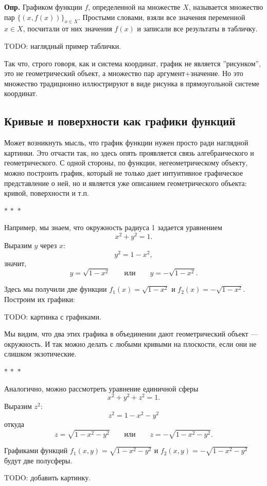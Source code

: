 \documentclass[a4paper,12pt]{article}
\newcommand{\threestars}{\begin{center}$ {\ast}\,{\ast}\,{\ast} $\end{center}}
\newcounter{z-counter}
\newcounter{th-counter}
\newcounter{df-counter}
\newcommand{\df}{\par\noindent\textbf{Опр.} }
\begin{document}
\df Графиком функции $f$, определенной на множестве $X$, называется множество пар $\{(x,f(x))\}_{x \in X}$. Простыми словами, взяли все значения переменной $x \in X$, посчитали от них значения $f(x)$ и записали все результаты в табличку.

TODO: наглядный пример таблички.

Так что, строго говоря, как и система координат, график не является ''рисунком'', это не геометрический объект, а множество пар аргумент+значение. Но это множество традиционно иллюстрируют в виде рисунка в прямоугольной системе координат.

\subsection*{Кривые и поверхности как графики функций}

Может возникнуть мысль, что график функции нужен просто ради наглядной картинки. Это отчасти так, но здесь опять проявляется связь алгебраического и геометрического. С одной стороны, по функции, негеометрическому объекту, можно построить график, который не только дает интуитивное графическое представление о ней, но и является уже описанием геометрического объекта: кривой, поверхности и т.п.

\threestars

Например, мы знаем, что окружность радиуса 1 задается уравнением
\[
x^2 + y^2 = 1.
\]
Выразим $y$ через $x$:
\[
y^2 = 1 - x^2,
\]
значит,
\[
y = \sqrt{1-x^2} \qquad \text{или}\qquad y = -\sqrt{1-x^2}.
\]

Здесь мы получили две функции $f_1(x) = \sqrt{1-x^2}$ и $f_2(x) = -\sqrt{1-x^2}$. Построим их графики:

TODO: картинка с графиками.

Мы видим, что два этих графика в объединении дают геометрический объект --- окружность. И так можно делать с любыми кривыми на плоскости, если они не слишком экзотические.

\threestars

Аналогично, можно рассмотреть уравнение единичной сферы
\[
x^2 + y^2 + z^2 = 1.
\]
Выразим $z^2$:
\[
z^2 = 1 - x^2 - y^2
\]
откуда
\[
z = \sqrt{1-x^2 - y^2} \qquad \text{или}\qquad z = -\sqrt{1-x^2 - y^2}.
\]

Графиками функций $f_1(x,y) = \sqrt{1-x^2 - y^2}$ и $f_2(x,y) = -\sqrt{1-x^2 - y^2}$ будут две полусферы.

TODO: добавить картинку.
\end{document}

